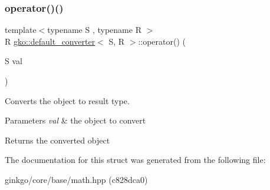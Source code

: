\subsubsection{\texorpdfstring{operator()()}{operator()()}}
{\footnotesize\ttfamily template$<$typename S , typename R $>$ \\
R \hyperlink{structgko_1_1default__converter}{gko\+::default\+\_\+converter}$<$ S, R $>$\+::operator() (\begin{DoxyParamCaption}\item[{S}]{val }\end{DoxyParamCaption})}



Converts the object to result type. 


\begin{DoxyParams}{Parameters}
{\em val} & the object to convert \\
\hline
\end{DoxyParams}
\begin{DoxyReturn}{Returns}
the converted object 
\end{DoxyReturn}


The documentation for this struct was generated from the following file\+:\begin{DoxyCompactItemize}
\item 
ginkgo/core/base/math.\+hpp (c828dca0)\end{DoxyCompactItemize}
